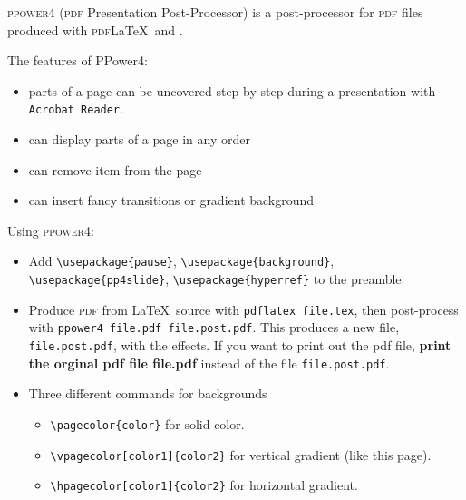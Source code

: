 \documentclass[landscape]{foils}
\title{\shadowbox{Presentation using \textsc{pdf}\LaTeX, \FoilTeX\, and \textsc{ppower4}}} %
\author{Latex Smart \\
         6356 Agricultural Road\\
         University of British Columbia\\
         Vancouver BC \\
         V6T 1Z2}
\date{\today}
\begin{document}
\thispagestyle{empty}

\setcounter{page}{0}

\maketitle

\LogoOn
\textsc{ppower4} (\textsc{pdf} Presentation Post-Processor)
is a post-processor for \textsc{pdf} files produced
with \textsc{pdf}\LaTeX \, and \FoilTeX.

The features of PPower4:
\begin{itemize}
  \item 
 parts of a page can be
uncovered step by step during a presentation with {\tt Acrobat Reader}.
  \item can display parts of a page in any order
  \item can remove item from the page
  \item can insert fancy transitions or gradient background
\end{itemize}



Using \textsc{ppower4}:
\vspace{-0.2in}
\begin{itemize}
\item Add \verb|\usepackage{pause}|, \verb|\usepackage{background}|,\\
  \verb|\usepackage{pp4slide}|, \verb|\usepackage{hyperref}| to the
  preamble.
\item Produce \textsc{pdf} from \LaTeX \, source with
  \texttt{pdflatex file.tex}, then post-process with \texttt{ppower4
  file.pdf file.post.pdf}.  This produces a new file,
  \texttt{file.post.pdf}, with the effects. If you want to print out the pdf
file, {\bf print the orginal pdf file file.pdf} instead of the file
\texttt{file.post.pdf}.
\item Three different commands for backgrounds
  \begin{itemize}
  \item \verb|\pagecolor{color}| for solid color.
  \item \verb|\vpagecolor[color1]{color2}| for vertical gradient (like
    this page).
  \item \verb|\hpagecolor[color1]{color2}| for horizontal gradient.
  \end{itemize}
\end{itemize}

\end{document}
